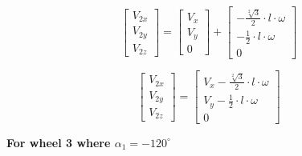 \documentclass[answers]{exam}
\begin{document}
\begin{questions}
\begin{solution}
            \begin{equation*}
                \begin{bmatrix}
                    V_{2x} \\
                    V_{2y} \\
                    V_{2z}
                \end{bmatrix}
                = \begin{bmatrix}
                    V_x \\
                    V_y \\
                    0
                \end{bmatrix}
                + \begin{bmatrix}
                    - \frac{\sqrt[2]{3}}{2} \cdot l \cdot \omega \\
                    - \frac{1}{2} \cdot l \cdot \omega           \\
                    0
                \end{bmatrix}
            \end{equation*}

            \begin{equation} \label{eq:2}
                \begin{bmatrix}
                    V_{2x} \\
                    V_{2y} \\
                    V_{2z}
                \end{bmatrix}
                = \begin{bmatrix}
                    V_x - \frac{\sqrt[2]{3}}{2} \cdot l \cdot \omega \\
                    V_y - \frac{1}{2} \cdot l \cdot \omega           \\
                    0
                \end{bmatrix}
            \end{equation}

            \textbf{For wheel 3 where $\alpha_1 = - 120^\circ$}


\end{solution}
\end{questions}
\end{document}
